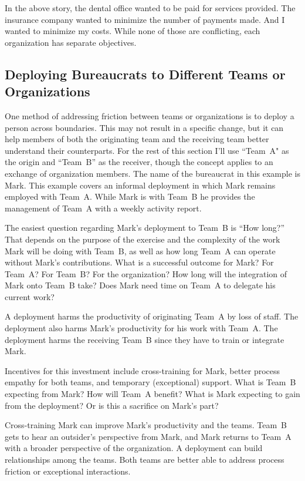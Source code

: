 In the above story, the dental office wanted to be paid for services provided. The insurance company wanted to minimize the number of payments made. And I wanted to minimize my costs. While none of those are conflicting, each organization has separate objectives.

\subsection*{Deploying Bureaucrats to Different Teams or Organizations\label{sec:prisoner-exchange}}

One method of addressing friction between teams or organizations is to deploy a person across boundaries. This may not result in a specific change, but it can help members of both the originating team and the receiving team better understand their counterparts. For the rest of this section I'll use ``Team~A" as the origin and ``Team~B'' as the receiver, though the concept applies to an exchange of organization members. The name of the bureaucrat in this example is Mark. This example covers an informal deployment in which Mark remains employed with Team~A. While Mark is with Team~B he provides the management of Team~A with a weekly activity report. 

The easiest question regarding Mark's deployment to Team~B is ``How long?'' That depends on the purpose of the exercise and the complexity of the work Mark will be doing with Team~B, as well as how long Team~A can operate without Mark's contributions. What is a successful outcome for Mark? For Team~A? For Team~B? For the organization? How long will the integration of Mark onto Team~B take? Does Mark need time on Team~A to delegate his current work?

A deployment harms the productivity of originating Team~A by loss of staff. The deployment also harms Mark's productivity for his work with Team~A. The deployment harms the receiving Team~B since they have to train or integrate Mark. 

Incentives for this investment include cross-training for Mark, better process empathy for both teams, and temporary (exceptional) support. What is Team~B expecting from Mark? How will Team~A benefit? What is Mark expecting to gain from the deployment? Or is this a sacrifice on Mark's part? 

Cross-training Mark can improve Mark's productivity  and the teams. 
Team~B gets to hear an outsider's perspective from Mark, and Mark returns to Team~A with a broader perspective of the organization.
A deployment can build relationships among the teams. Both teams are better able to address process friction or exceptional interactions. 



